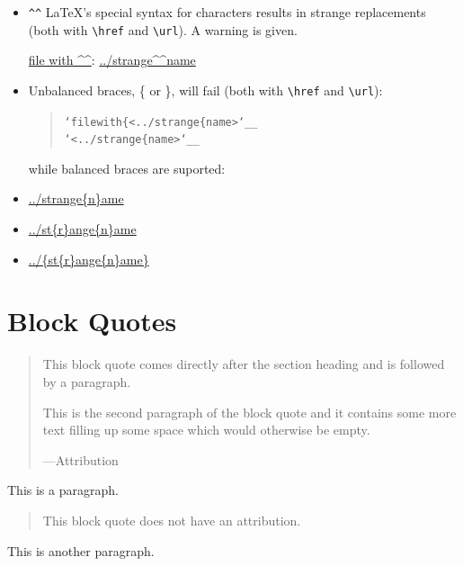 \documentclass[a4paper]{article}
\newenvironment{DUlineblock}[1]{%
    \list{}{\setlength{\partopsep}{\parskip}
            \addtolength{\partopsep}{\baselineskip}
            \setlength{\topsep}{0pt}
            \setlength{\itemsep}{0.15\baselineskip}
            \setlength{\parsep}{0pt}
            \setlength{\leftmargin}{#1}}
    \raggedright
  }
  {\endlist}
\begin{document}
\begin{itemize}
\item \texttt{\textasciicircum{}\textasciicircum{}} LaTeX's special syntax for characters results in \textquotedbl{}strange\textquotedbl{} replacements
(both with \texttt{\textbackslash{}href} and \texttt{\textbackslash{}url}). A warning is given.

\href{../strange^^name}{file with \textasciicircum{}\textasciicircum{}}:
\url{../strange^^name}

\item Unbalanced braces, \{ or \}, will fail (both with \texttt{\textbackslash{}href} and \texttt{\textbackslash{}url}):

\begin{quote}
\begin{alltt}
`file with \{ <../strange\{name>`__
`<../strange\{name>`__
\end{alltt}
\end{quote}

while balanced braces are suported:

\begin{DUlineblock}{0em}
\item[] \url{../strange{n}ame}
\item[] \url{../st{r}ange{n}ame}
\item[] \url{../{st{r}ange{n}ame}}
\end{DUlineblock}
\end{itemize}


\section{Block Quotes%
  \label{block-quotes}%
}

\begin{quote}
This block quote comes directly after the section heading and is
followed by a paragraph.

This is the second paragraph of the block quote and it contains
some more text filling up some space which would otherwise be
empty.
\nopagebreak

\raggedleft —Attribution
\end{quote}

This is a paragraph.

\begin{quote}
This block quote does not have an attribution.
\end{quote}

This is another paragraph.
\end{document}
